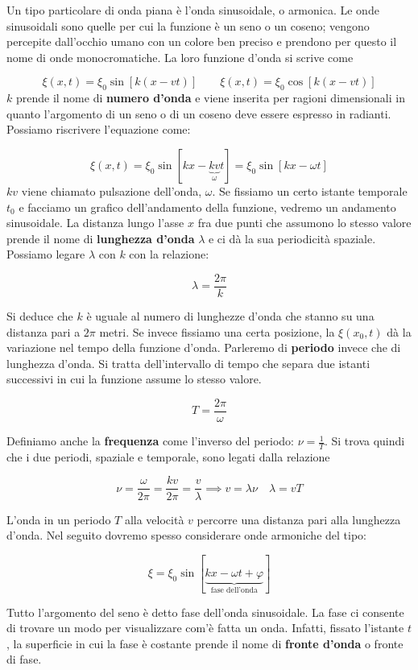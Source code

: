 Un tipo particolare di onda piana è l'onda sinusoidale, o armonica. Le onde sinusoidali sono quelle per cui la funzione è un seno o un coseno; vengono percepite dall'occhio umano con un colore ben preciso e prendono per questo il nome di onde monocromatiche. La loro funzione d'onda si scrive come

\[
	\xi(x,t) = \xi_0 \sin [k(x-vt)] \qquad \xi(x,t) = \xi_0 \cos [k(x-vt)]
\]
$k$ prende il nome di \textbf{numero d'onda} e viene inserita per ragioni dimensionali in quanto l'argomento di un seno o di un coseno deve essere espresso in radianti. Possiamo riscrivere l'equazione come:

\[
	\xi(x,t) = \xi_0 \sin [kx - \underbrace{kv}_{\omega} t] = \xi_0 \sin [kx - \omega t]
\]
$kv$ viene chiamato pulsazione dell'onda, $\omega$. Se fissiamo un certo istante temporale $t_0 $ e facciamo un grafico dell'andamento della funzione, vedremo un andamento sinusoidale. La distanza lungo l'asse $x$ fra due punti che assumono lo stesso valore prende il nome di \textbf{lunghezza d'onda} $\lambda$ e ci dà la sua periodicità spaziale. Possiamo legare $\lambda$ con $k$ con la relazione:

\[
	\lambda = \frac{2\pi}{k}
\]

Si deduce che $k$ è uguale al numero di lunghezze d'onda che stanno su una distanza pari a $ 2\pi  $ metri. Se invece fissiamo una certa posizione, la $ \xi(x_0,t) $ dà la variazione nel tempo della funzione d'onda. Parleremo di \textbf{periodo} invece che di lunghezza d'onda. Si tratta dell'intervallo di tempo che separa due istanti successivi in cui la funzione assume lo stesso valore.

\[
	T = \frac{2\pi}{\omega}
\]

Definiamo anche la \textbf{frequenza} come l'inverso del periodo: $ \nu = \frac{1}{T} $. Si trova quindi che i due periodi, spaziale e temporale, sono legati dalla relazione

\[
	\nu = \frac{\omega}{2\pi} = \frac{kv}{2\pi} = \frac{v}{\lambda} \implies v = \lambda\nu \quad \lambda = vT
\]

L'onda in un periodo $T$ alla velocità $v$ percorre una distanza pari alla lunghezza d'onda.
Nel seguito dovremo spesso considerare onde armoniche del tipo:

\[
	\xi = \xi_0 \sin [\underbrace{kx-\omega t + \varphi}_{\text{fase dell'onda}}]
\]

Tutto l'argomento del seno è detto fase dell'onda sinusoidale. La fase ci consente di trovare un modo per visualizzare com'è fatta un onda. Infatti, fissato l'istante $t$, la superficie in cui la fase è costante prende il nome di \textbf{fronte d'onda} o fronte di fase.

